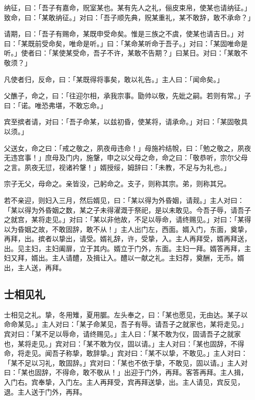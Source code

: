 \documentclass[]{article}
\begin{document}
纳征，曰：「吾子有嘉命，贶室某也。某有先人之礼，俪皮束帛，使某也请纳征。」致命，曰：「某敢纳征。」对曰：「吾子顺先典，贶某重礼，某不敢辞，敢不承命？」

请期，曰：「吾子有赐命，某既申受命矣。惟是三族之不虞，使某也请吉日。」对曰：「某既前受命矣，唯命是听。」曰：「某命某听命于吾子。」对曰：「某固唯命是听。」使者曰：「某使某受命，吾子不许，某敢不告期？」曰某日。对曰：「某敢不敬须？」

凡使者归，反命，曰：「某既得将事矣，敢以礼告。」主人曰：「闻命矣。」

父醮子，命之，曰：「往迎尔相，承我宗事。勖帅以敬，先妣之嗣。若则有常。」子曰：「诺。唯恐弗堪，不敢忘命。」

宾至摈者请，对曰：「吾子命某，以兹初昏，使某将，请承命。」对曰：「某固敬具以须。」

父送女，命之曰：「戒之敬之，夙夜毋违命！」母施衿结帨，曰：「勉之敬之，夙夜无违宫事！」庶母及门内，施鞶，申之以父母之命，命之曰：「敬恭听，宗尔父母之言。夙夜无愆，视诸衿鞶！」婿授绥，姆辞曰：「未教，不足与为礼也。」

宗子无父，母命之。亲皆没，己躬命之。支子，则称其宗。弟，则称其兄。

若不亲迎，则妇入三月，然后婿见，曰：「某以得为外昏姻，请觌。」主人对曰：「某以得为外昏姻之数，某之子未得濯溉于祭祀，是以未敢见。今吾子辱，请吾子之就宫，某将走见。」对曰：「某以非他故，不足以辱命，请终赐见。」对曰：「某得以为昏姻之故，不敢固辞，敢不从！」主人出门左，西面。婿入门，东面，奠挚，再拜，出。摈者以挚出，请受。婿礼辞，许，受挚，入。主人再拜受，婿再拜送，出。见主妇，主妇阖扉，立于其内。婿立于门外，东面。主妇一拜。婿答再拜，主妇又拜，婿出。主人请醴，及揖让入。醴以一献之礼。主妇荐，奠酬，无币。婿出，主人送，再拜。

\hypertarget{header-n20}{%
\subsection{士相见礼}\label{header-n20}}

士相见之礼。挚，冬用雉，夏用腒。左头奉之，曰：「某也愿见，无由达。某子以命命某见。」主人对曰：「某子命某见，吾子有辱。请吾子之就家也，某将走见。」宾对曰：「某不足以辱命，请终赐见。」主人曰：「某不敢为仪，固请吾子之就家也，某将走见。」宾对曰：「某不敢为仪，固以请。」主人对曰：「某也固辞，不得命，将走见。闻吾子称挚，敢辞挚。」宾对曰：「某不以挚，不敢见。」主人对曰：「某不足以习礼，敢固辞。」宾对曰：「某也不依于挚，不敢见，固以请。」主人对曰：「某也固辞，不得命，敢不敬从！」出迎于门外，再拜。客答再拜。主人揖，入门右。宾奉挚，入门左。主人再拜受，宾再拜送挚，出。主人请见，宾反见，退。主人送于门外，再拜。
\end{document}
